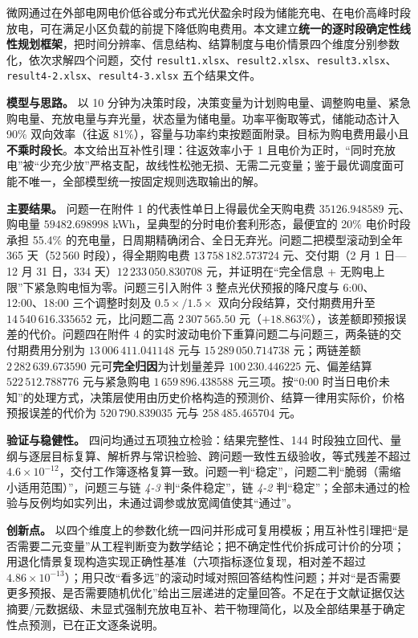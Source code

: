 微网通过在外部电网电价低谷或分布式光伏盈余时段为储能充电、在电价高峰时段放电，可在满足小区负载的前提下降低购电费用。本文建立\textbf{统一的逐时段确定性线性规划框架}，把时间分辨率、信息结构、结算制度与电价情景四个维度分别参数化，依次求解四个问题，交付 \texttt{result1.xlsx}、\texttt{result2.xlsx}、\texttt{result3.xlsx}、\texttt{result4-2.xlsx}、\texttt{result4-3.xlsx} 五个结果文件。

\textbf{模型与思路。} 以 10 分钟为决策时段，决策变量为计划购电量、调整购电量、紧急购电量、充放电量与弃光量，状态量为储电量。功率平衡取等式，储能动态计入 90\% 双向效率（往返 81\%），容量与功率约束按题面附录。目标为购电费用最小且\textbf{不乘时段长}。本文给出互补性引理：往返效率小于 1 且电价为正时，“同时充放电”被“少充少放”严格支配，故线性松弛无损、无需二元变量；鉴于最优调度面可能不唯一，全部模型统一按固定规则选取输出的解。

\textbf{主要结果。} 问题一在附件 1 的代表性单日上得最优全天购电费 $35126.948589$ 元、购电量 $59482.698998$ kWh，呈典型的分时电价套利形态，最便宜的 20\% 电价时段承担 55.4\% 的充电量，日周期精确闭合、全日无弃光。问题二把模型滚动到全年 365 天（52\,560 时段），得全期购电费 $13\,758\,182.573724$ 元、交付期（2 月 1 日—12 月 31 日，334 天）$12\,233\,050.830708$ 元，并证明在“完全信息 + 无购电上限”下紧急购电恒为零。问题三引入附件 3 整点光伏预报的降尺度与 6:00、12:00、18:00 三个调整时刻及 $0.5\times/1.5\times$ 双向分段结算，交付期费用升至 $14\,540\,616.335652$ 元，比问题二高 $2\,307\,565.50$ 元（$+18.863\%$），该差额即预报误差的代价。问题四在附件 4 的实时波动电价下重算问题二与问题三，两条链的交付期费用分别为 $13\,006\,411.041148$ 元与 $15\,289\,050.714738$ 元；两链差额 $2\,282\,639.673590$ 元可\textbf{完全归因}为计划量差异 $100\,230.446225$ 元、偏差结算 $522\,512.788776$ 元与紧急购电 $1\,659\,896.438588$ 元三项。按“0:00 时当日电价未知”的处理方式，决策层使用由历史价格构造的预测价、结算一律用实际价，价格预报误差的代价为 $520\,790.839035$ 元与 $258\,485.465704$ 元。

\textbf{验证与稳健性。} 四问均通过五项独立检验：结果完整性、144 时段独立回代、量纲与逐层目标复算、解析界与常识检验、跨问题一致性五级验收，等式残差不超过 $4.6\times10^{-12}$，交付工作簿逐格复算一致。问题一判“稳定”，问题二判“脆弱（需缩小适用范围）”，问题三与链 \emph{4-3} 判“条件稳定”，链 \emph{4-2} 判“稳定”；全部未通过的检验与反例均如实列出，未通过调参或放宽阈值使其“通过”。

\textbf{创新点。} 以四个维度上的参数化统一四问并形成可复用模板；用互补性引理把“是否需要二元变量”从工程判断变为数学结论；把不确定性代价拆成可计价的分项；用退化情景复现构造实现正确性基准（六项指标逐位复现，相对差不超过 $4.86\times10^{-13}$）；用只改“看多远”的滚动时域对照回答结构性问题；并对“是否需要更多预报、是否需要随机优化”给出三层递进的定量回答。不足在于文献证据仅达摘要/元数据级、未显式强制充放电互补、若干物理简化，以及全部结果基于确定性点预测，已在正文逐条说明。
